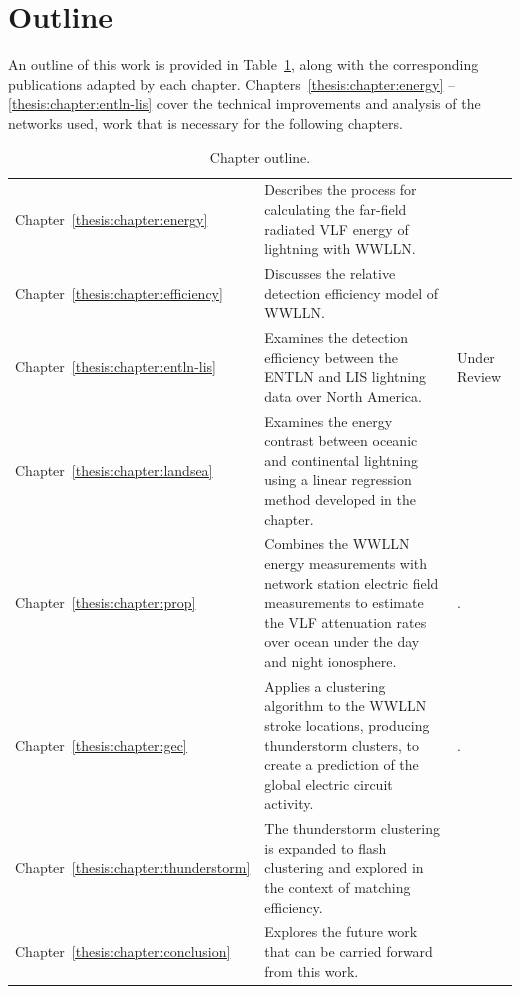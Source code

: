 \section{Outline}

An outline of this work is provided in Table~\ref{intro:table:outline}, along with the corresponding publications adapted by each chapter.
Chapters~\ref{thesis:chapter:energy} -- \ref{thesis:chapter:entln-lis} cover the technical improvements and analysis of the networks used, work that is necessary for the following chapters.

\begin{table}[ht!]
\caption{Chapter outline.}
\label{intro:table:outline}
\begin{center}
\begin{tabular}{l p{4in} l}

\rule{0pt}{3ex}
Chapter~\ref{thesis:chapter:energy}	&
Describes the process for calculating the far-field radiated VLF energy of lightning with WWLLN.	&
\citet{Hutchins2012}\\ 

\rule{0pt}{3ex}
Chapter~\ref{thesis:chapter:efficiency}	&
Discusses the relative detection efficiency model of WWLLN.	&
\citet{Hutchins2012a}\\ 

\rule{0pt}{3ex}
Chapter~\ref{thesis:chapter:entln-lis}	&
Examines the detection efficiency between the ENTLN and LIS lightning data over North America.	&
Under Review\\ 

\rule{0pt}{3ex}
Chapter~\ref{thesis:chapter:landsea}	&
Examines the energy contrast between oceanic and continental lightning using a linear regression method developed in the chapter.	&
\citet{Hutchins2013}\\ 

\rule{0pt}{3ex}
Chapter~\ref{thesis:chapter:prop} &
Combines the WWLLN energy measurements with network station electric field measurements to estimate the VLF attenuation rates over ocean under the day and night ionosphere.
& \citet{Hutchins2013a}.\\

\rule{0pt}{3ex}
Chapter~\ref{thesis:chapter:gec} &
Applies a clustering algorithm to the WWLLN stroke locations, producing thunderstorm clusters, to create a prediction of the global electric circuit activity.
& \citet{Hutchins2014}.\\

\rule{0pt}{3ex}
Chapter~\ref{thesis:chapter:thunderstorm}&
The thunderstorm clustering is expanded to flash clustering and explored in the context of matching efficiency. &
\\

\rule{0pt}{3ex}
Chapter~\ref{thesis:chapter:conclusion} &
Explores the future work that can be carried forward from this work. &
\\

\end{tabular}
\end{center}
\end{table}

